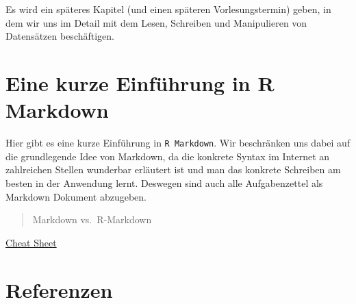 \documentclass[]{book}
\newenvironment{Shaded}{\begin{snugshade}}{\end{snugshade}}
\newcommand{\KeywordTok}[1]{\textcolor[rgb]{0.13,0.29,0.53}{\textbf{#1}}}
\newcommand{\DataTypeTok}[1]{\textcolor[rgb]{0.13,0.29,0.53}{#1}}
\newcommand{\StringTok}[1]{\textcolor[rgb]{0.31,0.60,0.02}{#1}}
\newcommand{\OperatorTok}[1]{\textcolor[rgb]{0.81,0.36,0.00}{\textbf{#1}}}
\newcommand{\NormalTok}[1]{#1}
\begin{document}
\begin{Shaded}
\end{Shaded}

Es wird ein späteres Kapitel (und einen späteren Vorlesungstermin)
geben, in dem wir uns im Detail mit dem Lesen, Schreiben und
Manipulieren von Datensätzen beschäftigen.

\appendix


\chapter{Eine kurze Einführung in R Markdown}\label{markdown}

Hier gibt es eine kurze Einführung in \texttt{R\ Markdown}. Wir
beschränken uns dabei auf die grundlegende Idee von Markdown, da die
konkrete Syntax im Internet an zahlreichen Stellen wunderbar erläutert
ist und man das konkrete Schreiben am besten in der Anwendung lernt.
Deswegen sind auch alle Aufgabenzettel als Markdown Dokument abzugeben.

\begin{quote}
Markdown vs.~R-Markdown
\end{quote}

\href{https://rstudio.com/wp-content/uploads/2016/03/rmarkdown-cheatsheet-2.0.pdf}{Cheat
Sheet}

\chapter{Referenzen}\label{refs}


\end{document}
